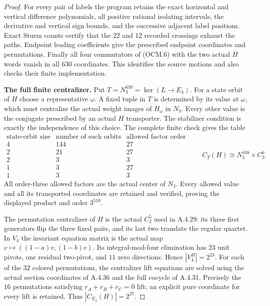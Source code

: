 \begin{proof}
For every pair of labels the program retains the exact
horizontal and vertical difference polynomials, all
positive rational isolating intervals, the derivative
and vertical sign bounds, and the successive adjacent
label positions.  Exact Sturm counts certify that the
$22$ and $12$ recorded crossings exhaust the paths.
Endpoint leading coefficients give the prescribed
endpoint coordinates and permutations.  Finally all
four commutators of (OCM.6) with the two actual $H$
words vanish in all $630$ coordinates.
This identifies the source motions and also checks
their finite implementation.

\par\medskip\noindent\textbf{The full finite centralizer.}\quad
Put $T=N_3^{630}=\ker(L\to E_4)$.
For a state orbit of $H$ choose a representative
$\omega$.  A fixed tuple in $T$ is determined by its
value at $\omega$, which must centralize the actual
weight images of $H_\omega$ in $N_3$.
Every other value is the conjugate prescribed by
an actual $H$ transporter.  The stabilizer condition
is exactly the independence of this choice.
The complete finite check gives the table
\[
\begin{array}{c|r|r}
 \text{state-orbit size}&\text{number of such orbits}
                       &\text{allowed factor order}\\ \hline
 4&144&27\\
 2&21&27\\
 2&3&3\\
 1&3&27\\
 1&3&3
\end{array}
\qquad
 C_T(H)\cong N_3^{168}\times C_3^6.
                                                               \tag{OCM.8}
\]
All order-three allowed factors are the actual center
of $N_3$.  Every allowed value and all its transported
coordinates are retained and verified, proving the
displayed product and order $3^{510}$.

The permutation centralizer of $H$ is the actual
$C_2^5$ used in A.4.29: its three first generators
flip the three fixed pairs, and its last two translate
the regular quartet.  In $V_4$ the invariant equation
matrix is the actual map
$v\mapsto((1-a)v,(1-b)v)$.
Its integral-mod-four elimination has $23$ unit
pivots, one residual two-pivot, and $11$ zero
directions.  Hence $|V_4^H|=2^{23}$.
For each of the $32$ colored permutations, the
centralizer lift equations are solved using the actual
section coordinates of A.4.36 and the full cocycle
of A.4.31.  Precisely the $16$ permutations satisfying
$r_A+r_B+r_C=0$ lift; an explicit pure coordinate
for every lift is retained.  Thus
$|C_{E_4}(H)|=2^{27}$.


\end{proof}
